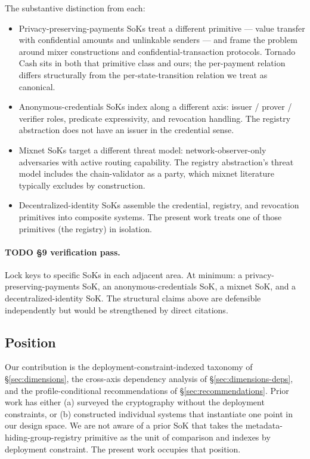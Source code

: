 The substantive distinction from each:
\begin{itemize}
  \item Privacy-preserving-payments SoKs treat a different primitive
    --- value transfer with confidential amounts and unlinkable
    senders --- and frame the problem around mixer constructions and
    confidential-transaction protocols. Tornado Cash sits in both
    that primitive class and ours; the per-payment relation differs
    structurally from the per-state-transition relation we treat as
    canonical.
  \item Anonymous-credentials SoKs index along a different axis:
    issuer / prover / verifier roles, predicate expressivity, and
    revocation handling. The registry abstraction does not have an
    issuer in the credential sense.
  \item Mixnet SoKs target a different threat model:
    network-observer-only adversaries with active routing
    capability. The registry abstraction's threat model includes the
    chain-validator as a party, which mixnet literature
    typically excludes by construction.
  \item Decentralized-identity SoKs assemble the credential, registry,
    and revocation primitives into composite systems. The present
    work treats one of those primitives (the registry) in isolation.
\end{itemize}

\paragraph{TODO §9 verification pass.} Lock keys to specific SoKs in
each adjacent area. At minimum: a privacy-preserving-payments SoK,
an anonymous-credentials SoK, a mixnet SoK, and a
decentralized-identity SoK. The structural claims above are defensible
independently but would be strengthened by direct citations.

\subsection{Position}

Our contribution is the deployment-constraint-indexed taxonomy of
\S\ref{sec:dimensions}, the cross-axis dependency analysis of
\S\ref{sec:dimensions-deps}, and the profile-conditional
recommendations of \S\ref{sec:recommendations}. Prior work has either
(a) surveyed the cryptography without the deployment constraints, or
(b) constructed individual systems that instantiate one point in our
design space. We are not aware of a prior SoK that takes the
metadata-hiding-group-registry primitive as the unit of comparison
and indexes by deployment constraint. The present work occupies that
position.
